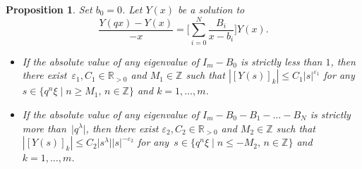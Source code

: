 \documentclass[pdftex]{sigma}
\numberwithin{equation}{section}
\newtheorem{Proposition}[Theorem]{Proposition}
\theoremstyle{definition}
\begin{document}
\begin{Proposition} \label{prop:qcintconvYx}
Set $b_0=0$.
Let $Y(x)$ be a solution to
\begin{equation}
\frac{Y(q x) - Y(x )}{-x} = \Biggl[ \sum^{N}_{i = 0}\frac{B_{i}}{x -b_{i}} \Biggr] Y(x).
\label{eq:YqxBYx00}
\end{equation}
\begin{itemize}\itemsep=0pt
\item[$(i)$] If the absolute value of any eigenvalue of $I_m - B_0$ is strictly less than $1$, then there exist~${\varepsilon _1 , C_1 \in \mathbb{R}_{>0}} $ and $M_1 \in \mathbb{Z} $ such that $|[Y(s )]_k | \leq C_1 |s |^{\varepsilon _1} $ for any $s \in \{ q^{n}\xi \mid n \geq M_1 ,\, n \in \mathbb{Z} \} $ and $k=1,\dots ,m$.
\item[$(ii)$] If the absolute value of any eigenvalue of $I_m - B_0 -B_1 - \dots - B_N$ is strictly more than~$\big|q^{\lambda }\big|$, then there exist $\varepsilon _2 , C_2 \in \mathbb{R}_{>0} $ and $M_2 \in \mathbb{Z} $ such that $|[Y(s )]_k | \leq C_2 \big|s ^{\lambda }\big| |s | ^{ - \varepsilon _2}$ for any~${s \in \{ q^{n}\xi \mid n \leq -M_2 ,\, n \in \mathbb{Z} \} }$ and $k=1,\dots ,m$.
\end{itemize}
\end{Proposition}
\end{document}
